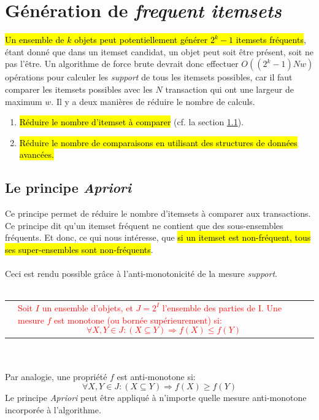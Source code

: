 \documentclass[letterpaper, 12pt]{article}
\newcommand{\alinea}{
\hspace*{0.5cm}}
\newcommand{\red}[1]{
	\textcolor{red}{#1}}
\newcommand{\myul}[1]{
		\underline{\smash{#1}}
	}
\begin{document}
	\section{Génération de \textit{frequent itemsets}}
		\alinea \hl{Un ensemble de $k$ objets peut potentiellement générer
			$2^k - 1$ itemsets fréquents}, étant donné que dans un
			itemset candidat, un objet peut soit être présent, soit ne
			pas l'être. Un algorithme de force brute devrait donc effectuer
			$O((2^k - 1)Nw)$ opérations pour calculer les \textit{support} de 
			tous les itemsets possibles, car il faut comparer les itemsets
			possibles avec les $N$ transaction qui ont une largeur de 
			maximum $w$. Il y a deux manières de réduire le nombre de 
			calculs.
		\begin{enumerate}
			\setlength{\itemsep}{0pt}
			\setlength{\parskip}{0pt}
			\setlength{\parsep}{0pt}
			\item \hl{Réduire le nombre d'itemset à comparer} (cf. la section
				\ref{sec:rules:apriori}).
			\item \hl{Réduire le nombre de comparaisons en utilisant des
				structures de données avancées.}
		\end{enumerate}
		\subsection{Le principe \textit{Apriori}}\label{sec:rules:apriori}
			\alinea Ce principe permet de réduire le nombre d'itemsets à
				comparer aux transactions. Ce principe dit qu'un itemset
				fréquent ne contient que des sous-ensembles fréquents.
				Et donc, ce qui nous intéresse, que\hl{ si un itemset est 
				non-fréquent, tous ses super-ensembles sont non-fréquents}.\\
			~\\
			\alinea Ceci est rendu possible grâce à l'anti-monotonicité
				de la mesure \textit{support}.\\~\\
			\begin{tabular}{lp{10cm}}
				\myul{\textbf{Propriété de Monotonicité}} &
					\red{Soit $I$ un ensemble d'objets, et $J = 2^I$ l'ensemble 
					des parties de I. Une mesure $f$ est monotone
					(ou bornée supérieurement) si:
					$$ \forall X, Y \in J : (X \subseteq Y) 
							\Longrightarrow f(X) \leq f(Y) $$}		
			\end{tabular}~\\~\\
			Par analogie, une propriété $f$ est anti-monotone si:
				$$ \forall X, Y \in J : (X \subseteq Y) 
							\Longrightarrow f(X) \geq f(Y) $$
			Le principe \textit{Apriori} peut être appliqué à n'importe 
			quelle mesure anti-monotone incorporée à l'algorithme.
\end{document}
